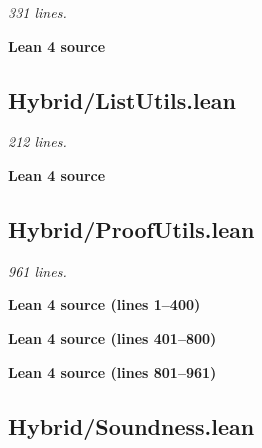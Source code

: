 \documentclass[11pt,a4paper]{article}
\renewcommand{\_}{\origtextunderscore\allowbreak}
\begin{document}
\emph{331 lines.}

\vspace{0.5\baselineskip}
\noindent\textcolor{green!40!black}{\textbf{Lean 4 source}}\par\vspace{0.25\baselineskip}

\vspace{0.5\baselineskip}

\hypertarget{hybridlistutils.lean}{%
\subsection{Hybrid/ListUtils.lean}\label{hybridlistutils.lean}}

\emph{212 lines.}

\vspace{0.5\baselineskip}
\noindent\textcolor{green!40!black}{\textbf{Lean 4 source}}\par\vspace{0.25\baselineskip}

\vspace{0.5\baselineskip}

\hypertarget{hybridproofutils.lean}{%
\subsection{Hybrid/ProofUtils.lean}\label{hybridproofutils.lean}}

\emph{961 lines.}

\noindent\textcolor{green!40!black}{\textbf{Lean 4 source (lines 1--400)}}\par\vspace{0.25\baselineskip}


\noindent\textcolor{green!40!black}{\textbf{Lean 4 source (lines 401--800)}}\par\vspace{0.25\baselineskip}


\noindent\textcolor{green!40!black}{\textbf{Lean 4 source (lines 801--961)}}\par\vspace{0.25\baselineskip}


\hypertarget{hybridsoundness.lean}{%
\subsection{Hybrid/Soundness.lean}\label{hybridsoundness.lean}}
\end{document}
